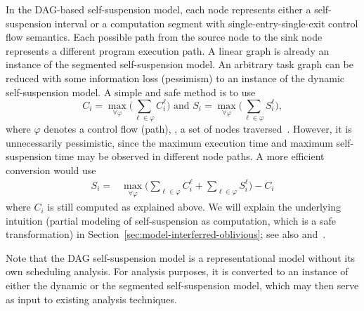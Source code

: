 In the DAG-based self-suspension model\cite{bletsas:thesis}, each node represents either a self-suspension interval or a computation segment
with single-entry-single-exit control flow semantics. Each possible path from the source node to the sink node
represents a different program execution path. A linear graph is already an instance of the segmented self-suspension model.
An arbitrary task graph can be reduced with some information loss (pessimism) to an instance of the dynamic self-suspension model. 
%
%
%
A simple and safe method is to use
\begin{equation*} 
C_i =  \max_{\forall \varphi} \Big(  \sum_{\ell \in \varphi} C_i^\ell   \Big)        \mbox{   and }
S_i =  \max_{\forall \varphi} \Big(  \sum_{\ell \in \varphi} S_i^\ell   \Big),
\end{equation*}
where $\varphi$ denotes a control flow (path), \ie, a set of nodes traversed~\cite{RTAS-AudsleyB04,bletsas:thesis}. However, it is unnecessarily pessimistic, since the maximum execution time and maximum self-suspension 
time may be observed in different node paths. A more efficient conversion would use
\begin{align} 
S_i =  &\max_{\forall \varphi} \Big(  \sum_{\ell \in \varphi} C_i^\ell + \sum_{\ell \in \varphi} S_i^\ell   \Big)  - C_i  \nonumber
\end{align}
where $C_i$ is still computed as explained above. We will explain the underlying intuition  (partial modeling of self-suspension as computation, which is a safe transformation) 
in Section~\ref{sec:model-interferred-oblivious}; see also and~\cite{RTAS-AudsleyB04,BletsasReport2015}.

Note that the DAG self-suspension model is a representational model without its own scheduling analysis. For analysis purposes, it is converted to an instance of either the dynamic or the segmented self-suspension model, which may then serve as input to existing analysis techniques. 

